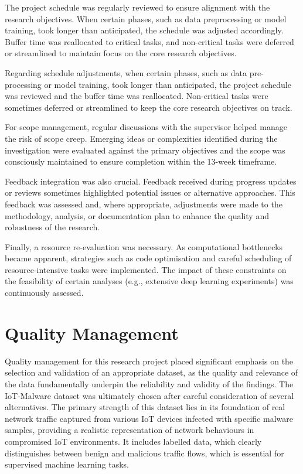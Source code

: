 The project schedule was regularly reviewed to ensure alignment with the research objectives. When certain phases, such as data preprocessing or model training, took longer than anticipated, the schedule was adjusted accordingly. Buffer time was reallocated to critical tasks, and non-critical tasks were deferred or streamlined to maintain focus on the core research objectives.

Regarding schedule adjustments, when certain phases, such as data pre-processing or model training, took longer than anticipated, the project schedule was reviewed and the buffer time was reallocated. Non-critical tasks were sometimes deferred or streamlined to keep the core research objectives on track.

For scope management, regular discussions with the supervisor helped manage the risk of scope creep. Emerging ideas or complexities identified during the investigation were evaluated against the primary objectives and the scope was consciously maintained to ensure completion within the 13-week timeframe.

Feedback integration was also crucial. Feedback received during progress updates or reviews sometimes highlighted potential issues or alternative approaches. This feedback was assessed and, where appropriate, adjustments were made to the methodology, analysis, or documentation plan to enhance the quality and robustness of the research.

Finally, a resource re-evaluation was necessary. As computational bottlenecks became apparent, strategies such as code optimisation and careful scheduling of resource-intensive tasks were implemented. The impact of these constraints on the feasibility of certain analyses (e.g., extensive deep learning experiments) was continuously assessed.

\section{Quality Management}

Quality management for this research project placed significant emphasis on the selection and validation of an appropriate dataset, as the quality and relevance of the data fundamentally underpin the reliability and validity of the findings. The IoT-Malware dataset was ultimately chosen after careful consideration of several alternatives. The primary strength of this dataset lies in its foundation of real network traffic captured from various IoT devices infected with specific malware samples, providing a realistic representation of network behaviours in compromised IoT environments. It includes labelled data, which clearly distinguishes between benign and malicious traffic flows, which is essential for supervised machine learning tasks.


